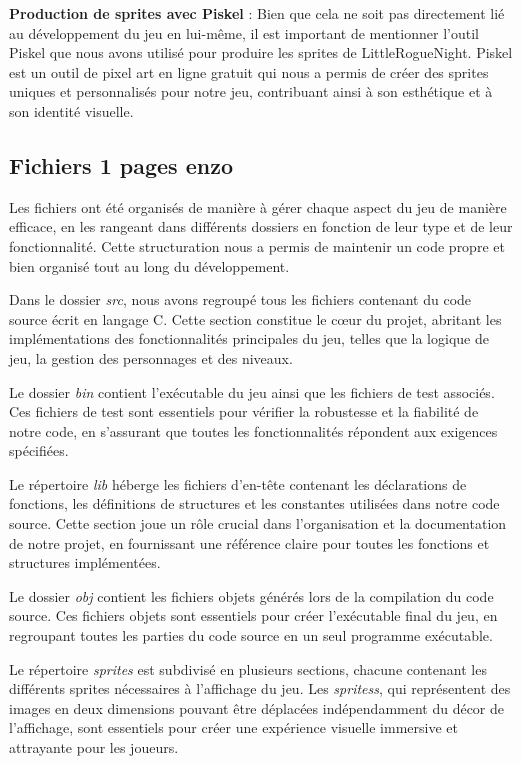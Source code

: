 \documentclass[10pt]{article}
\begin{document}
\textbf{Production de sprites avec Piskel} :
Bien que cela ne soit pas directement lié au développement du jeu en lui-même, il est important de mentionner l'outil Piskel que nous avons utilisé pour produire les sprites de LittleRogueNight. Piskel est un outil de pixel art en ligne gratuit qui nous a permis de créer des sprites uniques et personnalisés pour notre jeu, contribuant ainsi à son esthétique et à son identité visuelle.


\subsection{Fichiers 1 pages enzo}

Les fichiers ont été organisés de manière à gérer chaque aspect du jeu de manière efficace, en les rangeant dans différents dossiers en fonction de leur type et de leur fonctionnalité. Cette structuration nous a permis de maintenir un code propre et bien organisé tout au long du développement.

Dans le dossier \textit{src}, nous avons regroupé tous les fichiers contenant du code source écrit en langage C. Cette section constitue le cœur du projet, abritant les implémentations des fonctionnalités principales du jeu, telles que la logique de jeu, la gestion des personnages et des niveaux.

Le dossier \textit{bin} contient l'exécutable du jeu ainsi que les fichiers de test associés. Ces fichiers de test sont essentiels pour vérifier la robustesse et la fiabilité de notre code, en s'assurant que toutes les fonctionnalités répondent aux exigences spécifiées.

Le répertoire \textit{lib} héberge les fichiers d'en-tête contenant les déclarations de fonctions, les définitions de structures et les constantes utilisées dans notre code source. Cette section joue un rôle crucial dans l'organisation et la documentation de notre projet, en fournissant une référence claire pour toutes les fonctions et structures implémentées.

Le dossier \textit{obj} contient les fichiers objets générés lors de la compilation du code source. Ces fichiers objets sont essentiels pour créer l'exécutable final du jeu, en regroupant toutes les parties du code source en un seul programme exécutable.

Le répertoire \textit{sprites} est subdivisé en plusieurs sections, chacune contenant les différents sprites nécessaires à l'affichage du jeu. Les \textit{\glspl{sprites}}, qui représentent des images en deux dimensions pouvant être déplacées indépendamment du décor de l'affichage, sont essentiels pour créer une expérience visuelle immersive et attrayante pour les joueurs.
\end{document}
